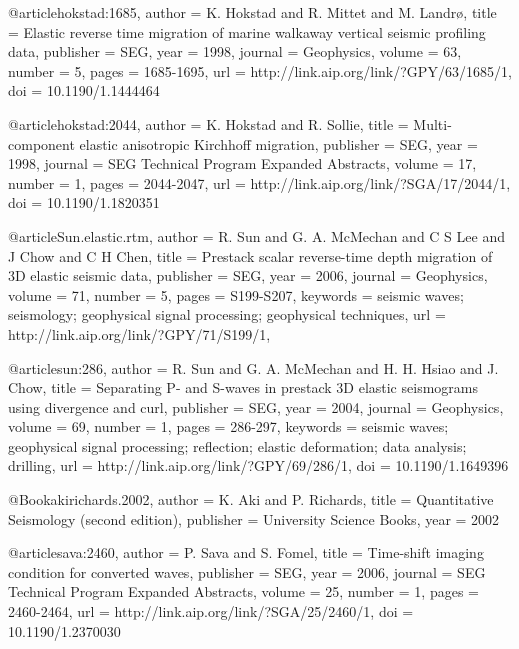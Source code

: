 {@article{hokstad:1685,
  author =	 {K. Hokstad and R. Mittet and M. Landr\o},
  title =	 {Elastic reverse time migration of marine walkaway
                  vertical seismic profiling data},
  publisher =	 {SEG},
  year =	 1998,
  journal =	 {Geophysics},
  volume =	 63,
  number =	 5,
  pages =	 {1685-1695},
  url =		 {http://link.aip.org/link/?GPY/63/1685/1},
  doi =		 {10.1190/1.1444464}
}

@article{hokstad:2044,
  author =	 {K. Hokstad and R. Sollie},
  title =	 {Multi-component elastic anisotropic {K}irchhoff
                  migration},
  publisher =	 {SEG},
  year =	 1998,
  journal =	 {SEG Technical Program Expanded Abstracts},
  volume =	 17,
  number =	 1,
  pages =	 {2044-2047},
  url =		 {http://link.aip.org/link/?SGA/17/2044/1},
  doi =		 {10.1190/1.1820351}
}

@article{Sun.elastic.rtm,
  author =	 {R. Sun and G. A. McMechan and C S Lee
                  and J Chow and C H Chen},
  title =	 {Prestack scalar reverse-time depth migration of {3D}
                  elastic seismic data},
  publisher =	 {SEG},
  year =	 2006,
  journal =	 {Geophysics},
  volume =	 71,
  number =	 5,
  pages =	 {S199-S207},
  keywords =	 {seismic waves; seismology; geophysical signal
                  processing; geophysical techniques},
  url =		 {http://link.aip.org/link/?GPY/71/S199/1},
}

@article{sun:286,
  author =	 {R. Sun and G. A. McMechan and H. H. Hsiao
                  and J. Chow},
  title =	 {Separating {P}- and {S}-waves in prestack {3D}
                  elastic seismograms using divergence and curl},
  publisher =	 {SEG},
  year =	 2004,
  journal =	 {Geophysics},
  volume =	 69,
  number =	 1,
  pages =	 {286-297},
  keywords =	 {seismic waves; geophysical signal processing;
                  reflection; elastic deformation; data analysis;
                  drilling},
  url =		 {http://link.aip.org/link/?GPY/69/286/1},
  doi =		 {10.1190/1.1649396}
}

@Book{akirichards.2002,
  author =	 {K. Aki and P. Richards},
  title =	 {Quantitative Seismology (second edition)},
  publisher =	 {University Science Books},
  year =	 2002
}

@article{sava:2460,
  author =	 {P. Sava and S. Fomel},
  title =	 {Time-shift imaging condition for converted waves},
  publisher =	 {SEG},
  year =	 2006,
  journal =	 {SEG Technical Program Expanded Abstracts},
  volume =	 25,
  number =	 1,
  pages =	 {2460-2464},
  url =		 {http://link.aip.org/link/?SGA/25/2460/1},
  doi =		 {10.1190/1.2370030}
}

}
